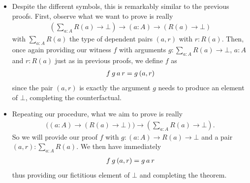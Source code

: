 \documentclass[11pt]{article}
\begin{document}
\begin{my proof}
\begin{itemize}
\begin{gather*}
f \hspace{0.2em} (g,h) \hspace{0.2em} (l \hspace{0.2em} p) = g \hspace{0.2em} p \\
f \hspace{0.2em} (g,h) \hspace{0.2em} (r \hspace{0.2em} h) = h \hspace{0.2em} q
\end{gather*}
a near re-ordering of the previous proof.
\item Despite the different symbols, this is remarkably similar to the previous proofs. First, observe what we want to prove is really \begin{gather*}
\left( \sum_{a : A} R(a) \to \bot \right) \to (a : A) \to (R(a) \to \bot)
\end{gather*}
with $\sum_{a : A} R(a)$ the type of dependent pairs $(a,r)$ with $r \colon R(a)$. Then, once again providing our witness $f$ with arguments $g \colon \sum_{a : A} R(a) \to \bot$, $a \colon A$ and $r \colon R(a)$ just as in previous proofs, we define $f$ as \begin{gather*}
f \hspace{0.2em} g \hspace{0.2em} a \hspace{0.2em} r = g \hspace{0.2em} (a,r)
\end{gather*}
since the pair $(a,r)$ is exactly the argument $g$ needs to produce an element of $\bot$, completing the counterfactual.
\item Repeating our procedure, what we aim to prove is really \begin{gather*}
\big( (a \colon A) \to ( R(a) \to \bot) \big) \to \left( \sum_{a : A} R(a) \to \bot \right).
\end{gather*}
So we will provide our proof $f$ with $g \colon (a \colon A) \to R(a) \to \bot$ and a pair $(a,r) \colon \sum_{a : A} R(a)$. We then have immediately \begin{gather*}
f \hspace{0.2em} g \hspace{0.2em} (a,r) = g \hspace{0.2em} a \hspace{0.2em} r 
\end{gather*}
thus providing our fictitious element of $\bot$ and completing the theorem.
\end{itemize}
\end{my proof}
\end{document}
